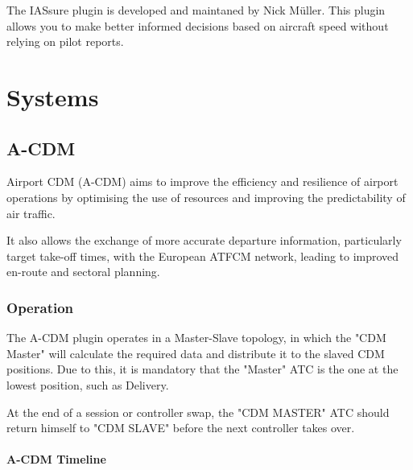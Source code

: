 \documentclass[a4paper,oneside,11pt]{memoir}
\begin{document}
\bigskip

The IASsure plugin is developed and maintaned by Nick Müller. This plugin allows you to make better informed decisions based on aircraft speed without relying on pilot reports.\cite{iassure}

\chapter{Systems}

\section{A-CDM}

Airport CDM (A-CDM) aims to improve the efficiency and resilience of airport operations by optimising the use of resources and improving the predictability of air traffic. 

It also allows the exchange of more accurate departure information, particularly target take-off times, with the European ATFCM network, leading to improved en-route and sectoral planning.\cite{eurocontrol}

\subsection{Operation}

The A-CDM plugin operates in a Master-Slave topology, in which the "CDM Master" will calculate the required data and distribute it to the slaved CDM positions. Due to this, it is mandatory that the "Master" ATC is the one at the lowest position, such as Delivery.



At the end of a session or controller swap, the "CDM MASTER" ATC should return himself to "CDM SLAVE" before the next controller takes over.

\subsubsection{A-CDM Timeline}
\end{document}
